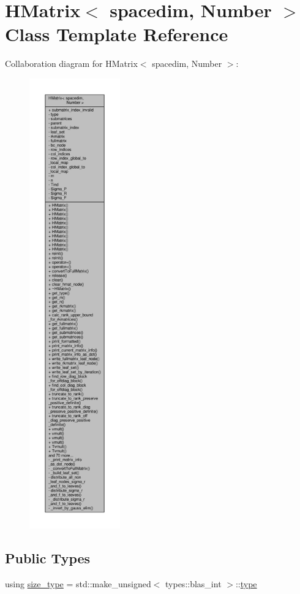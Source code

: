 \hypertarget{classHMatrix}{}\section{H\+Matrix$<$ spacedim, Number $>$ Class Template Reference}
\label{classHMatrix}


Collaboration diagram for H\+Matrix$<$ spacedim, Number $>$\+:\nopagebreak
\begin{figure}[H]
\begin{center}
\leavevmode
\includegraphics[height=550pt]{classHMatrix__coll__graph}
\end{center}
\end{figure}
\subsection*{Public Types}
\begin{DoxyCompactItemize}
\item 
using \hyperlink{classHMatrix_a5ca8dc549783d38371a01ecd621ecb34}{size\+\_\+type} = std\+::make\+\_\+unsigned$<$ types\+::blas\+\_\+int $>$\+::\hyperlink{classHMatrix_a89ef60f3ba737c04708195ca0bb13620}{type}
\end{DoxyCompactItemize}
